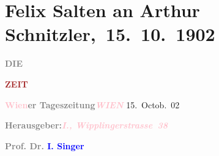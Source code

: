 

\renewcommand{\erwaehntePersonen}{Personen:  Forster, Hugo Ganz, Ernst Gettke, Theodor Herzl, Heinrich Kanner, Raphael Löwenfeld, Paul Paschen, Isidor Singer, Siegfried Trebitsch, Jakob Wassermann}
\renewcommand{\erwaehnteInstitutionen}{Institutionen: Burgtheater, Die Zeit, S. Fischer Verlag, Schiller-Theater}
\renewcommand{\erwaehnteOrte}{Orte: Berlin, Raimund-Theater, Wien, Wipplingerstraße}
\renewcommand{\erwaehnteWerke}{Werke: Altneuland. Roman, Der Moloch, Die Zeit, Die kleine Veronika, Fünfkreuzertanz, Liebelei. Schauspiel in drei Akten, [Artikel über Kulissenton], [Aufsatz über volkstümliche Klassikervorstellungen], »Altneuland«}
\section[ Felix Salten an Arthur Schnitzler, 15. 10. 1902]{Felix Salten an Arthur Schnitzler, 15. 10. 1902}
\nopagebreak{}
\rehead{ }\normalsize\beginnumbering{}
\toendnotes[C]{\smallbreak\pagebreak[2]}
\toendnotes[C]{\smallbreak}
\pstart
           \noindent{}{\pb}\textcolor{gray}{\textbf{DIE}}\pend
           
\pstart
           \textcolor{gray}{\textbf{\textcolor{brown}{ZEIT}{}\ledrightnote{\textcolor{brown}{Die Zeit}}}}\pend
           
\pstart
           \textcolor{gray}{\textbf{\textbf{\textcolor{pink}{Wien}{}\ledrightnote{\textcolor{pink}{Wien}}er Tageszeitung}}}\hfill \textcolor{gray}{\textbf{\emph{\textcolor{pink}{WIEN}{}\ledrightnote{\textcolor{pink}{Wien}}}}}{ }15. Octob. 02\pend
           
\pstart
           \textcolor{gray}{\textbf{Herausgeber:}}\hfill \textcolor{gray}{\textbf{\emph{\textcolor{pink}{I., Wipplingerstrasse 38}{}\ledrightnote{\textcolor{pink}{Wipplingerstraße}}}}}\pend
           
\pstart
           \textcolor{gray}{\textbf{\textbf{Prof. Dr. \textcolor{blue}{I. Singer}{}\ledrightnote{\textcolor{blue}{Isidor Singer}}}}}\pend
           
